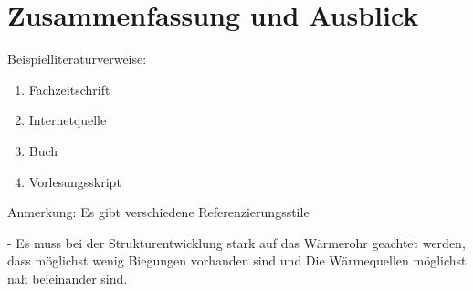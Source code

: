 \chapter{Zusammenfassung und Ausblick}
\label{chap:Ausblick}
\pagestyle{OnlySection}		%

Beispielliteraturverweise: 

\begin{enumerate}
	\item Fachzeitschrift
	\item Internetquelle
	\item Buch 
	\item Vorlesungsskript
\end{enumerate}

Anmerkung: Es gibt verschiedene Referenzierungsstile 

- Es muss bei der Strukturentwicklung stark auf das Wärmerohr geachtet werden, dass möglichst wenig Biegungen vorhanden sind und
Die Wärmequellen möglichst nah beieinander sind.
